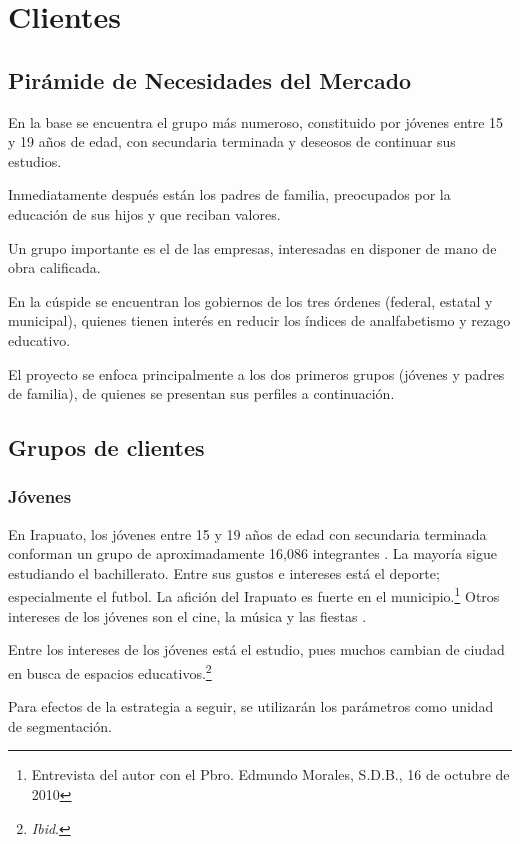 \section{Clientes}
\label{sec:Clientes}

\subsection{Pirámide de Necesidades del Mercado}

En la base se encuentra el grupo más numeroso, constituido por jóvenes entre 15 y 19 años de edad, con secundaria terminada y deseosos de continuar sus estudios.

Inmediatamente después están los padres de familia, preocupados por la educación de sus hijos y que reciban valores.

Un grupo importante es el de las empresas, interesadas en disponer de mano de obra calificada.

En la cúspide se encuentran los gobiernos de los tres órdenes (federal, estatal y municipal), quienes tienen interés en reducir los índices de analfabetismo y rezago educativo.

El proyecto se enfoca principalmente a los dos primeros grupos (jóvenes y padres de familia), de quienes se presentan sus perfiles a continuación.

\subsection{Grupos de clientes}

\subsubsection{Jóvenes}

En Irapuato, los j\'ovenes entre 15 y 19 a\~nos de edad con secundaria terminada conforman un grupo de aproximadamente 16,086 integrantes \citep{Inegi2005}. La mayor\'{i}a sigue estudiando el bachillerato. Entre sus gustos e intereses est\'a el deporte; especialmente el futbol. La afici\'on del Irapuato es fuerte en el municipio.\footnote{Entrevista del autor con el Pbro. Edmundo Morales, S.D.B., 16 de octubre de 2010} Otros intereses de los j\'ovenes son el cine, la m\'usica y las fiestas \citep{Cordero07}.

Entre los intereses de los jóvenes está el estudio, pues muchos cambian de ciudad en busca de espacios educativos.\footnote{\emph{Ibid}.}

Para efectos de la estrategia a seguir, se utilizarán los parámetros como unidad de segmentación.

